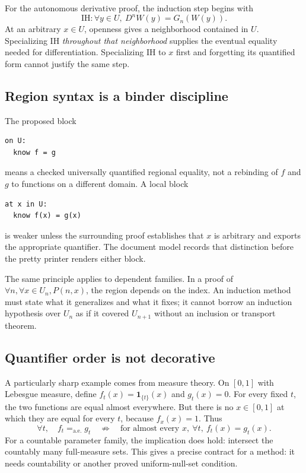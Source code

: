 \documentclass[11pt,a4paper]{article}
\newcommand{\code}[1]{\texttt{\detokenize{#1}}}
\newcommand{\AEeq}{\mathrel{=_{\mathrm{a.e.}}}}
\theoremstyle{definition}
\theoremstyle{remark}
\begin{document}
For the autonomous derivative proof, the induction step begins with
\[
 \mathrm{IH}:\forall y\in U,\ D^nW(y)=G_n(W(y)).
\]
At an arbitrary $x\in U$, openness gives a neighborhood contained in $U$.
Specializing IH \emph{throughout that neighborhood} supplies the eventual
equality needed for differentiation. Specializing IH to $x$ first and forgetting
its quantified form cannot justify the same step.

\subsection{Region syntax is a binder discipline}

The proposed block
\begin{lstlisting}
on U:
  know f = g
\end{lstlisting}
means a checked universally quantified regional equality, not a rebinding of
$f$ and $g$ to functions on a different domain. A local block
\begin{lstlisting}
at x in U:
  know f(x) = g(x)
\end{lstlisting}
is weaker unless the surrounding proof establishes that $x$ is arbitrary and
exports the appropriate quantifier. The document model records that distinction
before the pretty printer renders either block.

The same principle applies to dependent families. In a proof of
$\forall n,\forall x\in U_n,P(n,x)$, the region depends on the index. An
induction method must state what it generalizes and what it fixes; it cannot
borrow an induction hypothesis over $U_n$ as if it covered $U_{n+1}$ without
an inclusion or transport theorem.

\subsection{Quantifier order is not decorative}

A particularly sharp example comes from measure theory. On $[0,1]$ with
Lebesgue measure, define $f_t(x)=\mathbf 1_{\{t\}}(x)$ and $g_t(x)=0$. For
every fixed $t$, the two functions are equal almost everywhere. But there is
no $x\in[0,1]$ at which they are equal for every $t$, because $f_x(x)=1$.
Thus
\[
 \forall t,\quad f_t\AEeq g_t
 \quad\not\Longrightarrow\quad
 \text{for almost every }x,\ \forall t,\ f_t(x)=g_t(x).
\]
For a countable parameter family, the implication does hold: intersect the
countably many full-measure sets. This gives a precise contract for a
\code{collect almost_everywhere} method: it needs countability or another
proved uniform-null-set condition.
\end{document}
